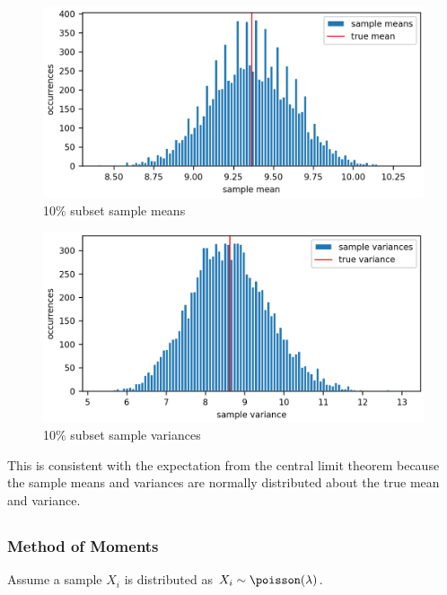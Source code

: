 \documentclass[11pt]{article}
\begin{document}
\subsection{}  %
\begin{figure}[H]
    \centering
    \includegraphics[width=5in]{6cfig1.png}
    \caption{10\% subset sample means}
    \label{6cfig1}
\end{figure}
\begin{figure}[H]
    \centering
    \includegraphics[width=5in]{6cfig2.png}
    \caption{10\% subset sample variances}
    \label{6cfig2}
\end{figure}
\begin{mdframed}
    This is consistent with the expectation from the central limit theorem
    because the sample means and variances are normally distributed about the
    true mean and variance.
\end{mdframed}

\subsection{}  %
\subsubsection{Method of Moments}
Assume a sample $X_i$ is distributed as $X_i\sim\poisson(\lambda)$.
\end{document}
